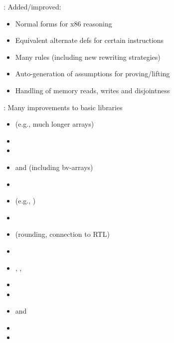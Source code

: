 
\begin{frame}

\implibtitle

: Added/improved:
\begin{itemize}
\item Normal forms for x86 reasoning
\item Equivalent alternate defs for certain instructions
\item Many rules (including new rewriting strategies)
\item Auto-generation of assumptions for proving/lifting
\item Handling of memory reads, writes and disjointness
\end{itemize}

\end{frame}


\begin{frame}

\implibtitle

: Many improvements to basic libraries
\begin{itemize}
\item {} (e.g., much longer arrays)
\item {}
\item {}
\item {} and  (including bv-arrays)
\item {}
\item {} (e.g., )
\item {}
\item {} (rounding, connection to RTL)
\item {}
\item {}, , 
\item {}
\item {}
\item {} and 
\item {}
\item {}

\end{itemize}

\end{frame}

